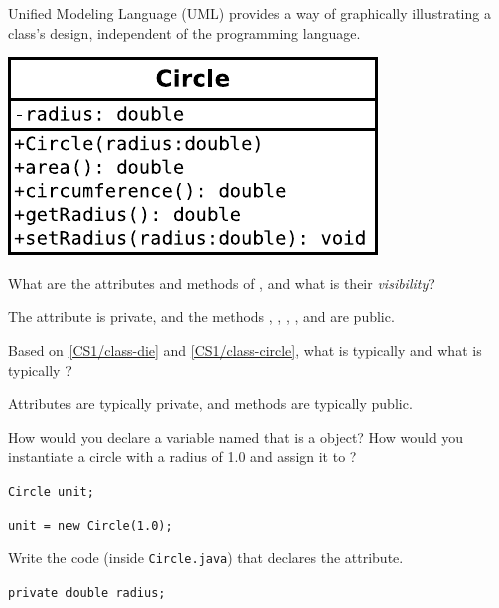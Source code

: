 \label{CS1/class-circle}

Unified Modeling Language (UML) provides a way of graphically illustrating a class’s design, independent of the programming language.

\begin{center}
\includegraphics{CS1/Circle.pdf}
\end{center}




\Q What are the attributes and methods of , and what is their \emph{visibility}?

\begin{answer}
The attribute  is private, and the methods , , , , and  are public.
\end{answer}


\Q Based on \ref{CS1/class-die} and \ref{CS1/class-circle}, what is typically  and what is typically ?

\begin{answer}
Attributes are typically private, and methods are typically public.
\end{answer}


\Q How would you declare a variable named  that is a  object?
How would you instantiate a circle with a radius of 1.0 and assign it to ?

\begin{answer}
\tt Circle unit;

\tt unit = new Circle(1.0);
\end{answer}


\Q Write the code (inside {\tt Circle.java}) that declares the  attribute.

\begin{answer}
\tt private double radius;
\end{answer}


